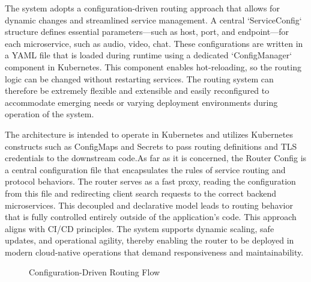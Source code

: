 The system adopts a configuration-driven routing approach that allows for dynamic changes and streamlined service management. A central `ServiceConfig` structure defines essential parameters—such as host, port, and endpoint—for each microservice, such as audio, video, chat. These configurations are written in a YAML file that is loaded during runtime using a dedicated `ConfigManager` component in Kubernetes. This component enables hot-reloading, so the routing logic can be changed without restarting services. The routing system can therefore be extremely flexible and extensible and easily reconfigured to accommodate emerging needs or varying deployment environments during operation of the system.

The architecture is intended to operate in Kubernetes and utilizes Kubernetes constructs such as ConfigMaps and Secrets to pass routing definitions and TLS credentials to the downstream code.As far as it is concerned, the Router Config is a central configuration file that encapsulates the rules of service routing and protocol behaviors. The router serves as a fast proxy, reading the configuration from this file and redirecting client search requests to the correct backend microservices. This decoupled and declarative model leads to routing behavior that is fully controlled entirely outside of the application's code. This approach aligns with CI/CD principles. The system supports dynamic scaling, safe updates, and operational agility, thereby enabling the router to be deployed in modern cloud-native operations that demand responsiveness and maintainability.


\begin{figure}[h]
\centering
{}
\caption{Configuration-Driven Routing Flow}
\label{fig:config_routing}
\end{figure}


